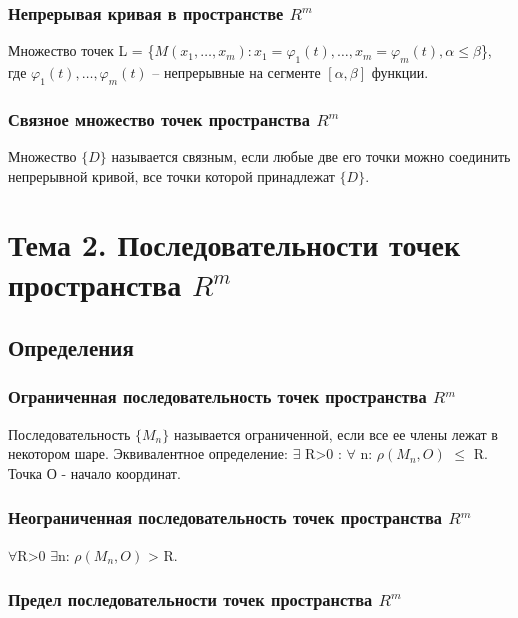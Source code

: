 \documentclass[a4paper, 12pt]{article}
\renewcommand{\phi}{\varphi}
\newcommand{\Rm}{\texorpdfstring{$R^m$}{Lg}}
\def\newline{}%
\begin{document}
            \subsubsection{Непрерывая кривая в пространстве \Rm}

            Множество точек L = \{$ M(x_1, \ldots ,x_m) : x_1 = \phi_1(t), \ldots, x_m = \phi_m(t),
            \alpha \leq \beta $\}, где $\phi_1(t), \ldots, \phi_m(t)$ -- непрерывные
            на сегменте $[\alpha,\beta]$ функции.

            \subsubsection{Связное множество точек пространства \Rm}

            Множество $\{D\}$ называется связным, если любые две его
            точки можно соединить непрерывной кривой, все точки которой
            принадлежат $\{D\}$.

    \section{Тема 2. Последовательности точек пространства \Rm}
        \subsection{Определения}
            \subsubsection{Ограниченная последовательность точек пространства \Rm}

            Последовательность $\{M_n\}$  называется ограниченной, если все ее члены лежат в \newline
            некотором шаре. \newline
            Эквивалентное определение: $\exists$ R>0 : $\forall$ n: $\rho(M_n, O)$ $\leq$ R.
            Точка О - начало координат.  


            \subsubsection{Неограниченная последовательность точек пространства \Rm}

            $\forall$R>0 $\exists$n: $\rho(M_n, O)$ > R.

            \subsubsection{Предел последовательности точек пространства \Rm}
\end{document}
